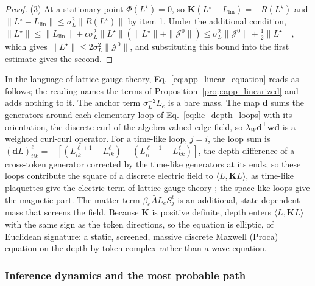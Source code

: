 \documentclass[twoside,11pt]{article}
\begin{document}
\begin{proof}
(3) At a stationary point $\Phi(L^\star)=0$, so $\mathbf K(L^\star-L_{\mathrm{lin}})=-R(L^\star)$ and $\|L^\star-L_{\mathrm{lin}}\|\le\sigma_L^2\|R(L^\star)\|$ by item 1. Under the additional condition, $\|L^\star\|\le\|L_{\mathrm{lin}}\|+c\sigma_L^2\|L^\star\|(\|L^\star\|+\|\mathcal J^0\|)\le\sigma_L^2\|\mathcal J^0\|+\tfrac12\|L^\star\|$, which gives $\|L^\star\|\le2\sigma_L^2\|\mathcal J^0\|$, and substituting this bound into the first estimate gives the second.
\end{proof}

In the language of lattice gauge theory, Eq.~\eqref{eq:app_linear_equation} reads as follows; the reading names the terms of Proposition~\ref{prop:app_linearized} and adds nothing to it. The anchor term $\sigma_L^{-2}L_e$ is a bare mass. The map $\mathbf d$ sums the generators around each elementary loop of Eq.~\eqref{eq:lie_depth_loops} with its orientation, the discrete curl of the algebra-valued edge field, so $\lambda_W\mathbf d^\top\mathbf w\mathbf d$ is a weighted curl-curl operator. For a time-like loop, $j=i$, the loop sum is $(\mathbf dL)_{iik}^\ell=-[(L_{ik}^{\ell+1}-L_{ik}^\ell)-(L_{ii}^{\ell+1}-L_{kk}^\ell)]$, the depth difference of a cross-token generator corrected by the time-like generators at its ends, so these loops contribute the square of a discrete electric field to $\langle L,\mathbf K L\rangle$, as time-like plaquettes give the electric term of lattice gauge theory \citep{KogutSusskind1975,Creutz1983}; the space-like loops give the magnetic part. The matter term $\beta_e\bar AL_eS_j^\ell$ is an additional, state-dependent mass that screens the field. Because $\mathbf K$ is positive definite, depth enters $\langle L,\mathbf K L\rangle$ with the same sign as the token directions, so the equation is elliptic, of Euclidean signature: a static, screened, massive discrete Maxwell (Proca) equation on the depth-by-token complex rather than a wave equation.

\subsubsection{Inference dynamics and the most probable path}
\end{document}
